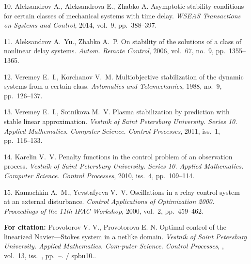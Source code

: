 {10. Aleksandrov A., Aleksandrova E., Zhabko A. Asymptotic
stability conditions for certain classes of mechanical systems
with time delay. \textit{WSEAS Transactions on Systems and
Control}, 2014, vol.~9, pp.~388--397.

11. Aleksandrov A.~Yu., Zhabko A.~P. On stability of the solutions
of a class of nonlinear delay systems. \textit{Autom. Remote
Control}, 2006, vol.~67, no.~9, pp.~1355--1365.

12. Veremey E.~I., Korchanov V.~M. Multiobjective stabilization of
the dynamic systems from a certain class. \textit{Avtomatics and
Telemechanics}, 1988, no.~9, pp.~126--137.

13. Veremey E.~I., Sotnikova M.~V. Plasma stabilization by
prediction with stable linear approximation. \textit{Vestnik of
Saint Petersburg University. Series 10. Applied Mathematics.
Computer Science. Control Processes}, 2011, iss.~1, pp.~116--133.

14. Karelin V.~V. Penalty functions in the control problem of an
observation process. \textit{Vestnik of Saint Petersburg
University. Series 10. Applied Mathematics. Computer Science.
Control Processes}, 2010, iss.~4, pp.~109--114.

15. Kamachkin A.~M., Yevstafyeva V.~V. Oscillations in a relay
control system at an external disturbance. \textit{Control
Applications of Optimization 2000. Proceedings of the 11th IFAC
Workshop}, 2000, vol.~2, pp.~459--462.






\vskip 3mm

{\bf For citation:}   Provotorov V. V., Provotorova E. N. Optimal
control of the linearized Navier---Stokes system in a netlike
domain. {\it Vestnik of Saint Petersburg University. Applied
Mathematics. Com-\linebreak puter Science. Control Processes},
\issueyear, vol.~13, iss.~\issuenum,
pp.~\pageref{p9}--\pageref{p9e}. \doivyp/
spbu10.\issueyear.


}
